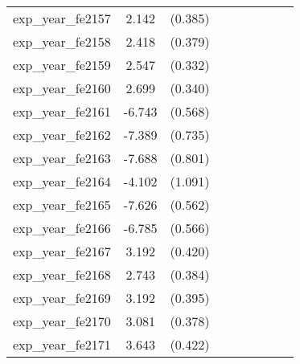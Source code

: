 {\begin{tabular}{l*{4}{cc}}
exp\_year\_fe2157&    2.142\sym{***}&  (0.385)&                  &         &                  &         &                  &         \\
exp\_year\_fe2158&    2.418\sym{***}&  (0.379)&                  &         &                  &         &                  &         \\
exp\_year\_fe2159&    2.547\sym{***}&  (0.332)&                  &         &                  &         &                  &         \\
exp\_year\_fe2160&    2.699\sym{***}&  (0.340)&                  &         &                  &         &                  &         \\
exp\_year\_fe2161&   -6.743\sym{***}&  (0.568)&                  &         &                  &         &                  &         \\
exp\_year\_fe2162&   -7.389\sym{***}&  (0.735)&                  &         &                  &         &                  &         \\
exp\_year\_fe2163&   -7.688\sym{***}&  (0.801)&                  &         &                  &         &                  &         \\
exp\_year\_fe2164&   -4.102\sym{***}&  (1.091)&                  &         &                  &         &                  &         \\
exp\_year\_fe2165&   -7.626\sym{***}&  (0.562)&                  &         &                  &         &                  &         \\
exp\_year\_fe2166&   -6.785\sym{***}&  (0.566)&                  &         &                  &         &                  &         \\
exp\_year\_fe2167&    3.192\sym{***}&  (0.420)&                  &         &                  &         &                  &         \\
exp\_year\_fe2168&    2.743\sym{***}&  (0.384)&                  &         &                  &         &                  &         \\
exp\_year\_fe2169&    3.192\sym{***}&  (0.395)&                  &         &                  &         &                  &         \\
exp\_year\_fe2170&    3.081\sym{***}&  (0.378)&                  &         &                  &         &                  &         \\
exp\_year\_fe2171&    3.643\sym{***}&  (0.422)&                  &         &                  &         &                  &         \\

\end{tabular}}
